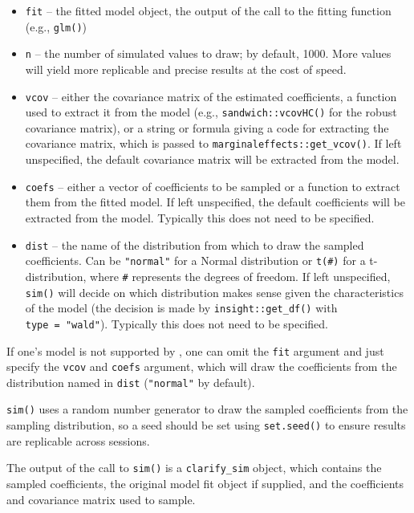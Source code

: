 \begin{itemize}
\item
  \texttt{fit} -- the fitted model object, the output of the call to the fitting function (e.g., \texttt{glm()})
\item
  \texttt{n} -- the number of simulated values to draw; by default, 1000. More values will yield more replicable and precise results at the cost of speed.
\item
  \texttt{vcov} -- either the covariance matrix of the estimated coefficients, a function used to extract it from the model (e.g., \texttt{sandwich::vcovHC()} for the robust covariance matrix), or a string or formula giving a code for extracting the covariance matrix, which is passed to \texttt{marginaleffects::get\_vcov()}. If left unspecified, the default covariance matrix will be extracted from the model.
\item
  \texttt{coefs} -- either a vector of coefficients to be sampled or a function to extract them from the fitted model. If left unspecified, the default coefficients will be extracted from the model. Typically this does not need to be specified.
\item
  \texttt{dist} -- the name of the distribution from which to draw the sampled coefficients. Can be \texttt{"normal"} for a Normal distribution or \texttt{t(\#)} for a t-distribution, where \texttt{\#} represents the degrees of freedom. If left unspecified, \texttt{sim()} will decide on which distribution makes sense given the characteristics of the model (the decision is made by \texttt{insight::get\_df()} with \texttt{type\ =\ "wald"}). Typically this does not need to be specified.
\end{itemize}

If one's model is not supported by , one can omit the \texttt{fit} argument and just specify the \texttt{vcov} and \texttt{coefs} argument, which will draw the coefficients from the distribution named in \texttt{dist} (\texttt{"normal"} by default).

\texttt{sim()} uses a random number generator to draw the sampled coefficients from the sampling distribution, so a seed should be set using \texttt{set.seed()} to ensure results are replicable across sessions.

The output of the call to \texttt{sim()} is a \texttt{clarify\_sim} object, which contains the sampled coefficients, the original model fit object if supplied, and the coefficients and covariance matrix used to sample.

